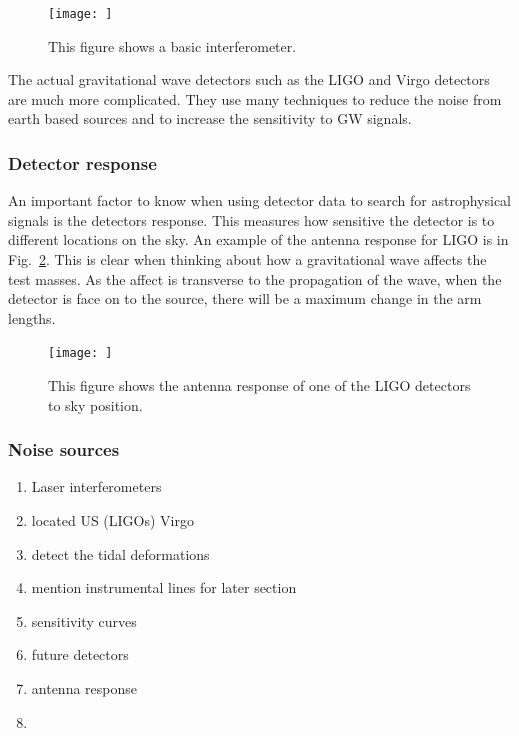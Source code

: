 \begin{figure}
    \centering
    \texttt{[image: ]}
    \caption{This figure shows a basic interferometer.}
    \label{detectors:interfereometer}
\end{figure}

The actual gravitational wave detectors such as the \ac{LIGO} \cite{} and Virgo \cite{} detectors are much more complicated.
They use many techniques to reduce the noise from earth based sources and to increase the sensitivity to \ac{GW} signals.


\subsubsection{Detector response}

An important factor to know when using detector data to search for astrophysical signals is the detectors response.
This measures how sensitive the detector is to different locations on the sky.
An example of the antenna response for \ac{LIGO} is in Fig.~\ref{detectors:response}.
This is clear when thinking about how a gravitational wave affects the test masses. 
As the affect is transverse to the propagation of the wave, when the detector is face on to the source, there will be a maximum change in the arm lengths.

\begin{figure}
    \centering
    \texttt{[image: ]}
    \caption{This figure shows the antenna response of one of the \ac{LIGO} detectors to sky position.}
    \label{detectors:response}
\end{figure}

\subsubsection{Noise sources}
\begin{enumerate}
    \item Laser interferometers
    \item located US (LIGOs) Virgo
    \item detect the tidal deformations 
    \item mention instrumental lines for later section
    \item sensitivity curves
    \item future detectors
    \item antenna response
    \item 
\end{enumerate}

